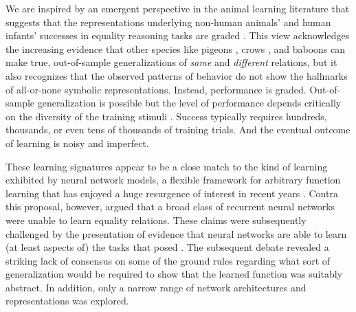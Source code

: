 \documentclass{article}
\renewcommand{\cite}{\citep}
\begin{document}
We are inspired by an emergent perspective in the animal learning literature that suggests that the representations underlying non-human animals' and human infants' successes in equality reasoning tasks are graded \cite{wasserman:2017}. This view acknowledges the increasing evidence that other species like pigeons \cite{cook2007}, crows \cite{smirnova2015}, and baboons \cite{fagot2011} can make true, out-of-sample generalizations of \emph{same} and \emph{different} relations, but it also recognizes that the observed patterns of behavior do not show the hallmarks of all-or-none symbolic representations. Instead, performance is graded. Out-of-sample generalization is possible but the level of performance depends critically on the diversity of the training stimuli \cite[e.g.,][]{castro2010}. Success typically requires hundreds, thousands, or even tens of thousands of training trials. And the eventual outcome of learning is noisy and imperfect.

These learning signatures appear to be a close match to the kind of learning exhibited by neural network models, a flexible framework for arbitrary function learning that has enjoyed a huge resurgence of interest in recent years \cite{lecun2015}. Contra this proposal, however, \citet{marcus:1999} argued that a broad class of recurrent neural networks were unable to learn equality relations. These claims were subsequently challenged by the presentation of evidence that neural networks are able to learn (at least aspects of) the tasks that \citeauthor{marcus:1999} posed \cite{dienes:1999,seidenberg:1999a,seidenberg:1999b,elman:1999,negishi:1999}. The subsequent debate \cite[reviewed in][]{alhama:2019} revealed a striking lack of consensus on some of the ground rules regarding what sort of generalization would be required to show that the learned function was suitably abstract. In addition, only a narrow range of network architectures and representations was explored.
\end{document}
